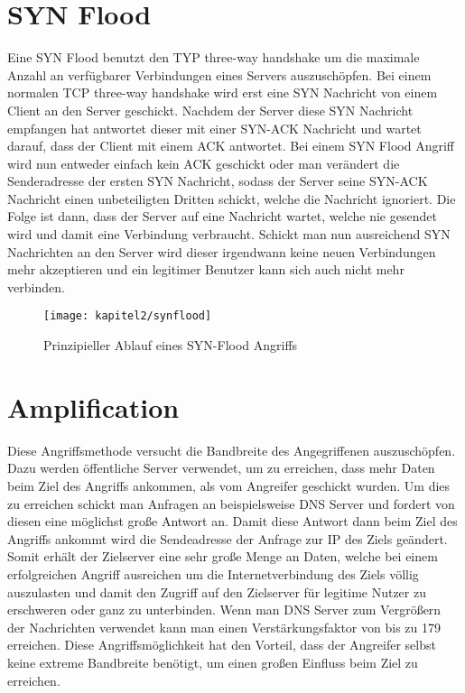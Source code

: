 \section{SYN Flood}

Eine SYN Flood benutzt den TYP three-way handshake um die maximale Anzahl an verfügbarer Verbindungen eines Servers auszuschöpfen. Bei einem normalen TCP three-way handshake wird erst eine SYN Nachricht von einem Client an den Server geschickt. Nachdem der Server diese SYN Nachricht empfangen hat antwortet dieser mit einer SYN-ACK Nachricht und wartet darauf, dass der Client mit einem ACK antwortet. Bei einem SYN Flood Angriff wird nun entweder einfach kein ACK geschickt oder man verändert die Senderadresse der ersten SYN Nachricht, sodass der Server seine SYN-ACK Nachricht einen unbeteiligten Dritten schickt, welche die Nachricht ignoriert. Die Folge ist dann, dass der Server auf eine Nachricht wartet, welche nie gesendet wird und damit eine Verbindung verbraucht. Schickt man nun ausreichend SYN Nachrichten an den Server wird dieser irgendwann keine neuen Verbindungen mehr akzeptieren und ein legitimer Benutzer kann sich auch nicht mehr verbinden.

\begin{figure}[h]
		\centering
		\texttt{[image: kapitel2/synflood]}
		\caption[SYN-Flooding]{Prinzipieller Ablauf eines SYN-Flood Angriffs}
		\label{img:synflood}
\end{figure}

\section{Amplification}

Diese Angriffsmethode versucht die Bandbreite des Angegriffenen auszuschöpfen. Dazu werden öffentliche Server verwendet, um zu erreichen, dass mehr Daten beim Ziel des Angriffs ankommen, als vom Angreifer geschickt wurden. Um dies zu erreichen schickt man Anfragen an beispielsweise DNS Server und fordert von diesen eine möglichst große Antwort an. Damit diese Antwort dann beim Ziel des Angriffs ankommt wird die Sendeadresse der  Anfrage zur IP des Ziels geändert. Somit erhält der Zielserver eine sehr große Menge an Daten, welche bei einem erfolgreichen Angriff ausreichen um die Internetverbindung des Ziels völlig auszulasten und damit den Zugriff auf den Zielserver für legitime Nutzer zu erschweren oder ganz zu unterbinden. Wenn man DNS Server zum Vergrößern der Nachrichten verwendet kann man einen Verstärkungsfaktor von bis zu 179 erreichen. Diese Angriffsmöglichkeit hat den Vorteil, dass der Angreifer selbst keine extreme Bandbreite benötigt, um einen großen Einfluss beim Ziel zu erreichen.

